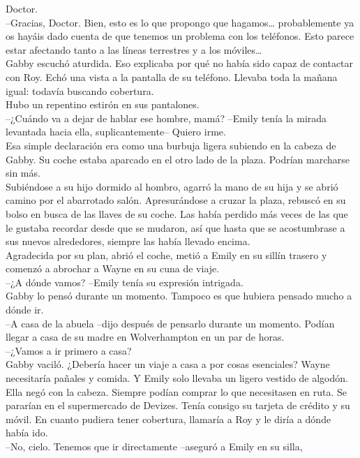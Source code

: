 Doctor.\\
--Gracias, Doctor. Bien, esto es lo que propongo que hagamos\ldots{}
probablemente ya os hayáis dado cuenta de que tenemos un problema con
los teléfonos. Esto parece estar afectando tanto a las líneas terrestres
y a los móviles\ldots{}\\
Gabby escuchó aturdida. Eso explicaba por qué no había sido capaz de
contactar con Roy. Echó una vista a la pantalla de su teléfono. Llevaba
toda la mañana igual: todavía buscando cobertura.\\
Hubo un repentino estirón en sus pantalones.\\
--¿Cuándo va a dejar de hablar ese hombre, mamá? --Emily tenía la mirada
levantada hacia ella, suplicantemente-- Quiero irme.\\
Esa simple declaración era como una burbuja ligera subiendo en la cabeza
de Gabby. Su coche estaba aparcado en el otro lado de la plaza. Podrían
marcharse sin más.\\
Subiéndose a su hijo dormido al hombro, agarró la mano de su hija y se
abrió camino por el abarrotado salón. Apresurándose a cruzar la plaza,
rebuscó en su bolso en busca de las llaves de su coche. Las había
perdido más veces de las que le gustaba recordar desde que se mudaron,
así que hasta que se acostumbrase a sus nuevos alrededores, siempre las
había llevado encima.\\
Agradecida por su plan, abrió el coche, metió a Emily en su sillín
trasero y comenzó a abrochar a Wayne en su cuna de viaje.\\
--¿A dónde vamos? --Emily tenía su expresión intrigada.\\
Gabby lo pensó durante un momento. Tampoco es que hubiera pensado mucho
a dónde ir.\\
--A casa de la abuela --dijo después de pensarlo durante un momento.
Podían llegar a casa de su madre en Wolverhampton en un par de horas.\\
--¿Vamos a ir primero a casa?\\
Gabby vaciló. ¿Debería hacer un viaje a casa a por cosas esenciales?
Wayne necesitaría pañales y comida. Y Emily solo llevaba un ligero
vestido de algodón.\\
Ella negó con la cabeza. Siempre podían comprar lo que necesitasen en
ruta. Se pararían en el supermercado de Devizes. Tenía consigo su
tarjeta de crédito y su móvil. En cuanto pudiera tener cobertura,
llamaría a Roy y le diría a dónde había ido.\\
--No, cielo. Tenemos que ir directamente --aseguró a Emily en su silla,
